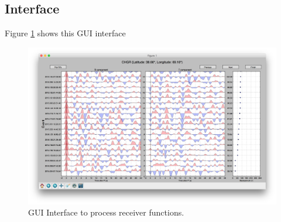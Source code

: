 \documentclass[12pt, a4paper]{report}
\begin{document}
\subsection{Interface}
Figure \ref{fig:pick} shows this GUI interface 
\begin{figure}[htbp]
  \centering
  \includegraphics[width= 1\textwidth]{./snapshot.png}
  \caption{GUI Interface to process receiver functions.}\label{fig:pick}
\end{figure}
\end{document}

